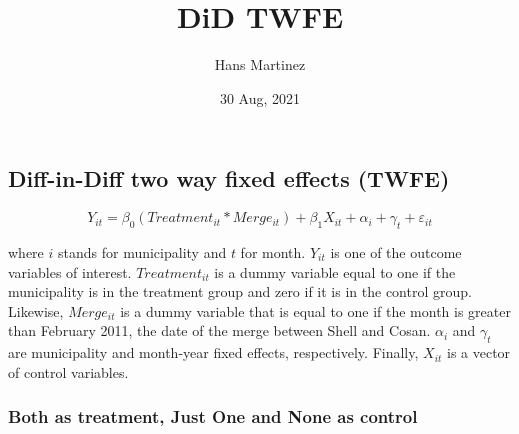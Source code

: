 \documentclass[
]{article}
\title{DiD TWFE}
\author{Hans Martinez}
\date{30 Aug, 2021}
\begin{document}
\maketitle

\hypertarget{diff-in-diff-two-way-fixed-effects-twfe}{%
\subsection{Diff-in-Diff two way fixed effects
(TWFE)}\label{diff-in-diff-two-way-fixed-effects-twfe}}

\begin{equation}
  Y_{it}=\beta_{0}(Treatment_{it}*Merge_{it}) + \beta_1 X_{it} + \alpha_{i} + \gamma_{t}  + \varepsilon_{it}
\end{equation}

where \(i\) stands for municipality and \(t\) for month. \(Y_{it}\) is
one of the outcome variables of interest. \(Treatment_{it}\) is a dummy
variable equal to one if the municipality is in the treatment group and
zero if it is in the control group. Likewise, \(Merge_{it}\) is a dummy
variable that is equal to one if the month is greater than February
2011, the date of the merge between Shell and Cosan. \(\alpha_i\) and
\(\gamma_t\) are municipality and month-year fixed effects,
respectively. Finally, \(X_{it}\) is a vector of control variables.

\hypertarget{both-as-treatment-just-one-and-none-as-control}{%
\subsubsection{Both as treatment, Just One and None as
control}\label{both-as-treatment-just-one-and-none-as-control}}
\end{document}

